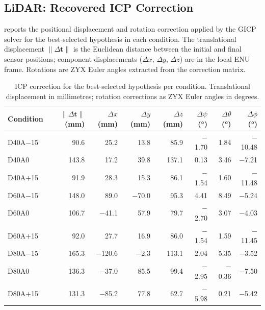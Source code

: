 \subsection{LiDAR: Recovered ICP Correction}
\label{subsec:pa-results-lidar-transformation}

 reports the positional displacement and rotation correction applied by the GICP solver for the best-selected hypothesis in each condition. The translational displacement $\lVert\Delta\mathbf{t}\rVert$ is the Euclidean distance between the initial and final sensor positions; component displacements ($\Delta x$, $\Delta y$, $\Delta z$) are in the local ENU frame. Rotations are ZYX Euler angles extracted from the correction matrix.

\begin{table}[htbp]
  \centering
  \small
  \setlength{\tabcolsep}{3pt}
  \caption{ICP correction for the best-selected hypothesis per condition. Translational displacement in millimetres; rotation corrections as ZYX Euler angles in degrees.}
  \label{tab:pa-results-lidar-icp-correction}
  \begin{tabular}{@{} l r r r r r r r @{}}
    \toprule
    \textbf{Condition} &
    \boldmath$\lVert\Delta\mathbf{t}\rVert$ \textbf{(mm)} &
    \boldmath$\Delta x$ \textbf{(mm)} &
    \boldmath$\Delta y$ \textbf{(mm)} &
    \boldmath$\Delta z$ \textbf{(mm)} &
    \boldmath$\Delta\psi$ \textbf{(°)} &
    \boldmath$\Delta\theta$ \textbf{(°)} &
    \boldmath$\Delta\phi$ \textbf{(°)} \\
    \midrule
    D40A$-$15 &  90.6 &    25.2 &    13.8 &    85.9 & $-$1.70 &    1.84 & $-$10.48 \\
    D40A0     & 143.8 &    17.2 &    39.8 &   137.1 &    0.13 &    3.46 &  $-$7.21 \\
    D40A$+$15 &  91.9 &    28.3 &    15.3 &    86.1 & $-$1.54 &    1.60 & $-$11.48 \\
    D60A$-$15 & 148.0 &    89.0 & $-$70.0 &    95.3 &    4.41 &    8.49 &  $-$5.24 \\
    D60A0     & 106.7 & $-$41.1 &    57.9 &    79.7 & $-$2.70 &    3.07 &  $-$4.03 \\
    D60A$+$15 &  92.0 &    27.7 &    16.9 &    86.0 & $-$1.54 &    1.59 & $-$11.45 \\
    D80A$-$15 & 165.3 & $-$120.6 & $-$2.3 &   113.1 &    2.04 &    5.35 &  $-$3.52 \\
    D80A0     & 136.3 & $-$37.0 &    85.5 &    99.4 & $-$2.95 & $-$0.36 &  $-$7.50 \\
    D80A$+$15 & 131.3 & $-$85.2 &    77.8 &    62.7 & $-$5.98 &    0.21 &  $-$5.42 \\
    \bottomrule
  \end{tabular}
\end{table}

